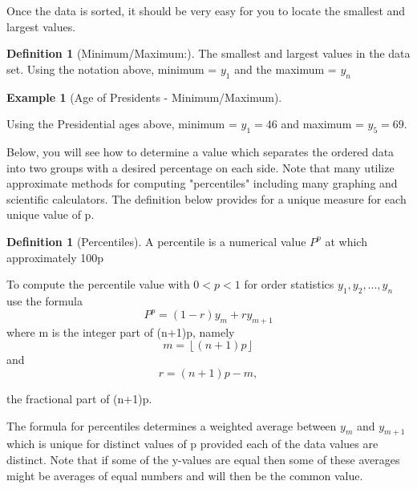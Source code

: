 \documentclass[10pt,]{book}
\theoremstyle{plain}
\theoremstyle{definition}
\newtheorem{definition}[theorem]{Definition}
\theoremstyle{definition}
\newtheorem{example}[theorem]{Example}
\theoremstyle{definition}
\numberwithin{equation}{section}
\newcommand{\lt}{ < }
\begin{document}
	Once the data is sorted, it should be very easy for you to locate the smallest and largest values. 
\begin{definition}[{Minimum/Maximum:}]\label{definition-2}
The smallest and largest values in the data set. Using the notation above, minimum = \(y_1\) and the maximum = \(y_n\)%
\end{definition}
\begin{example}[Age of Presidents - Minimum/Maximum]\label{example-2}

	Using the Presidential ages above, minimum = \(y_1 = 46\) and maximum = \(y_5 = 69\).
\end{example}
\par

	Below, you will see how to determine a value which separates the ordered data into two groups with a desired percentage on each side. Note that many utilize approximate methods for computing "percentiles" including many graphing and scientific calculators. The definition below provides for a unique measure for each unique value of p.
\begin{definition}[{Percentiles}]\label{definition-3}
A percentile is a numerical value \(P^p\) at which approximately 100p%
\par
To compute the percentile value with \(0 \lt p \lt 1\) for order statistics \(y_1, y_2, ..., y_n\) use the formula 
		\begin{equation*}P^{p} = (1-r)y_m + ry_{m+1}\end{equation*}
	where m is the integer part of (n+1)p, namely 
		\begin{equation*}m = \left\lfloor (n+1)p \right\rfloor\end{equation*} 
	and 
		\begin{equation*}r = (n+1)p - m,\end{equation*}
	
	the fractional part of (n+1)p. 
\end{definition}
\par
The formula for percentiles determines a weighted average between \(y_m\) and \(y_{m+1}\) which is unique for distinct values of p provided each of the data values are distinct. Note that if some of the y-values are equal then some of these averages might be averages of equal numbers and will then be the common value.%
\end{document}
